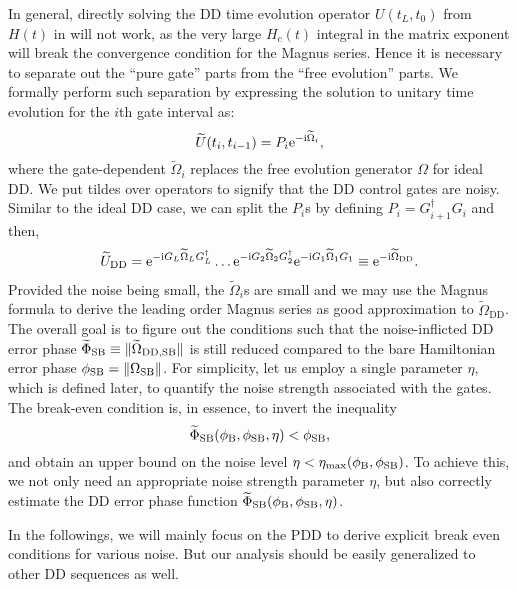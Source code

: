 \documentclass[pra,reprint,superscriptaddress]{revtex4-2}
\newcommand{\wtO}{\widetilde{\Omega}}
\newcommand{\wtU}{\widetilde{U}}
\newcommand{\wtep}{\widetilde{\Phi}_\mathrm{SB}}
\newcommand{\rDD}{\mathrm{DD}}
\newcommand{\rmax}{\mathrm{max}}
\begin{document}
In general, directly solving the DD time evolution operator $U(t_L,t_0)$ from $H(t)$ in  will not work, as the very large $H_c(t)$ integral in the matrix exponent will break the convergence condition for the Magnus series. Hence it is necessary to separate out the ``pure gate'' parts from the ``free evolution'' parts. We formally perform such separation  by  expressing the solution to unitary time evolution for the $i$th gate interval as:
\begin{equation}\label{eq:noisy-gate-formal}
 \wtU(t_i,t_{i-1})
 = P_i \upe^{-\upi \wtO_i}, 
\end{equation}
where the gate-dependent $\wtO_i$ replaces the free evolution generator $\Omega$ for ideal DD. 
We put tildes over operators to signify that the DD control gates are noisy. 
Similar to the ideal DD case, we can split the $P_i$s by defining $P_i=G_{i+1}^\dagger G_{i}$ and then,
\begin{equation}
\begin{aligned}
  \wtU_\rDD= \upe^{-\upi  G_L \wtO_L  G_L^\dagger} \ldots
  \upe^{-\upi G_2 \wtO_2  G_2^\dagger} \upe^{-\upi G_1\wtO_1G_1}\equiv\upe^{-\upi\wtO_\rDD} .
\end{aligned}
\end{equation}
Provided the noise being small, the $\wtO_i$s are small and we may use the Magnus formula to derive the leading order Magnus series as good approximation to $\wtO_\rDD$.
The overall goal is to figure out the conditions such that the noise-inflicted DD error phase $\wtep \equiv \norm{\wtO_{\rDD,\rSB}}$  is still reduced compared to the bare Hamiltonian error phase $\phi_{\mathrm{SB}} = \Vert {\Omega_{\mathrm{SB}}} \Vert$. For simplicity, let us employ a single parameter $\eta$, which is defined later,  to quantify the noise strength associated with the gates.  The break-even condition is, in essence, to invert the inequality
\begin{equation}
 \wtep(\phi_\rB,\phi_\rSB,\eta) < \phi_\rSB,
\end{equation} 
and obtain an upper bound on the noise level $\eta<\eta_{\rmax}(\phi_\rB, \phi_\rSB)$.
To achieve this, we not only need an appropriate noise strength parameter $\eta$, but also correctly estimate the DD error phase function $\wtep(\phi_\rB,\phi_\rSB,\eta)$.  

 In the followings, we will mainly focus on the PDD to derive explicit break even conditions for various noise. But our analysis should be easily generalized to other DD sequences as well.
\end{document}
